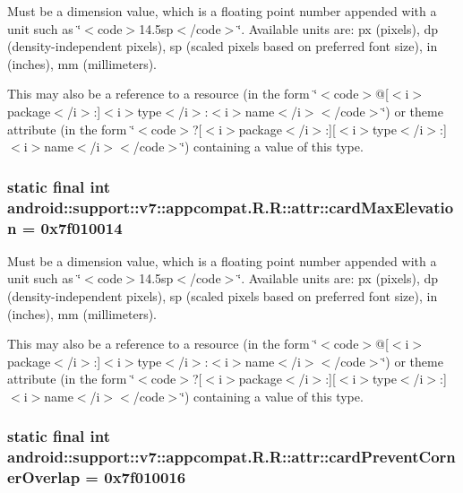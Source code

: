 Must be a dimension value, which is a floating point number appended with a unit such as \char`\"{}$<$code$>$14.5sp$<$/code$>$\char`\"{}. Available units are: px (pixels), dp (density-independent pixels), sp (scaled pixels based on preferred font size), in (inches), mm (millimeters). 

This may also be a reference to a resource (in the form \char`\"{}$<$code$>$@\mbox{[}$<$i$>$package$<$/i$>$:\mbox{]}$<$i$>$type$<$/i$>$:$<$i$>$name$<$/i$>$$<$/code$>$\char`\"{}) or theme attribute (in the form \char`\"{}$<$code$>$?\mbox{[}$<$i$>$package$<$/i$>$:\mbox{]}\mbox{[}$<$i$>$type$<$/i$>$:\mbox{]}$<$i$>$name$<$/i$>$$<$/code$>$\char`\"{}) containing a value of this type. \hypertarget{classandroid_1_1support_1_1v7_1_1appcompat_1_1_r_1_1attr_ed766bc49c8a40b40002aef417ad31de}{
\subsubsection[{cardMaxElevation}]{\setlength{\rightskip}{0pt plus 5cm}static final int android::support::v7::appcompat.R.R::attr::cardMaxElevation = 0x7f010014}}
\label{classandroid_1_1support_1_1v7_1_1appcompat_1_1_r_1_1attr_ed766bc49c8a40b40002aef417ad31de}


Must be a dimension value, which is a floating point number appended with a unit such as \char`\"{}$<$code$>$14.5sp$<$/code$>$\char`\"{}. Available units are: px (pixels), dp (density-independent pixels), sp (scaled pixels based on preferred font size), in (inches), mm (millimeters). 

This may also be a reference to a resource (in the form \char`\"{}$<$code$>$@\mbox{[}$<$i$>$package$<$/i$>$:\mbox{]}$<$i$>$type$<$/i$>$:$<$i$>$name$<$/i$>$$<$/code$>$\char`\"{}) or theme attribute (in the form \char`\"{}$<$code$>$?\mbox{[}$<$i$>$package$<$/i$>$:\mbox{]}\mbox{[}$<$i$>$type$<$/i$>$:\mbox{]}$<$i$>$name$<$/i$>$$<$/code$>$\char`\"{}) containing a value of this type. \hypertarget{classandroid_1_1support_1_1v7_1_1appcompat_1_1_r_1_1attr_9f65630fe83ebdf9b9c17142f764a9c7}{
\subsubsection[{cardPreventCornerOverlap}]{\setlength{\rightskip}{0pt plus 5cm}static final int android::support::v7::appcompat.R.R::attr::cardPreventCornerOverlap = 0x7f010016}}
\label{classandroid_1_1support_1_1v7_1_1appcompat_1_1_r_1_1attr_9f65630fe83ebdf9b9c17142f764a9c7}


